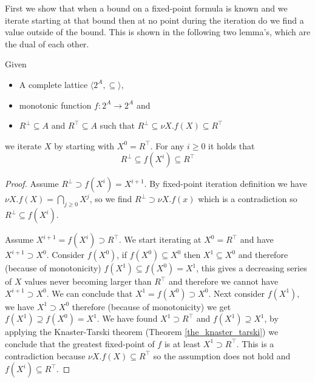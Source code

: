 First we show that when a bound on a fixed-point formula is known and we iterate starting at that bound then at no point during the iteration do we find a value outside of the bound. This is shown in the following two lemma's, which are the dual of each other.
\begin{lemma}
	\label{lem_fixpoint_bounds_nu}
	Given
	\begin{itemize}
		\item A complete lattice $\langle 2^A, \subseteq \rangle$,
		\item monotonic function $f : 2^A \rightarrow 2^A$ and
		\item $R^\bot \subseteq A$ and $R^\top \subseteq A$ such that $R^\bot \subseteq \nu X. f(X) \subseteq R^\top$
	\end{itemize}
	we iterate $X$ by starting with $X^0 = R^\top$. For any $i \geq 0$ it holds that
	\[ R^\bot \subseteq f(X^i) \subseteq R^\top \]
	\begin{proof}
		Assume $R^\bot \supset f(X^i) = X^{i+1}$. By fixed-point iteration definition we have $\nu X.f(X) = \bigcap_{j\geq0} X^j$, so we find $R^\bot \supset \nu X.f(x)$ which is a contradiction so $R^\bot \subseteq f(X^i)$.
		
		Assume $X^{i+1} = f(X^i) \supset R^\top$. We start iterating at $X^0 = R^\top$ and have $X^{i+1} \supset X^0$. Consider $f(X^0)$, if $f(X^0) \subseteq X^0$ then $X^1 \subseteq X^0$ and therefore (because of monotonicity) $f(X^1) \subseteq f(X^0) = X^1$, this gives a decreasing series of $X$ values never becoming larger than $R^\top$ and therefore we cannot have $X^{i+1} \supset X^0$. We can conclude that $X^1 = f(X^0) \supset X^0$. Next consider $f(X^1)$, we have $X^1 \supset X^0$ therefore (because of monotonicity) we get $f(X^1) \supseteq f(X^0) = X^1$. We have found $X^1 \supset R^\top$ and $f(X^1) \supseteq X^1$, by applying the Knaster-Tarski theorem (Theorem \ref{the_knaster_tarski}) we conclude that the greatest fixed-point of $f$ is at least $X^1 \supset R^\top$. This is a contradiction because $\nu X.f(X) \subseteq R^\top$ so the assumption does not hold and $f(X^i) \subseteq R^\top$.
	\end{proof}
\end{lemma}

